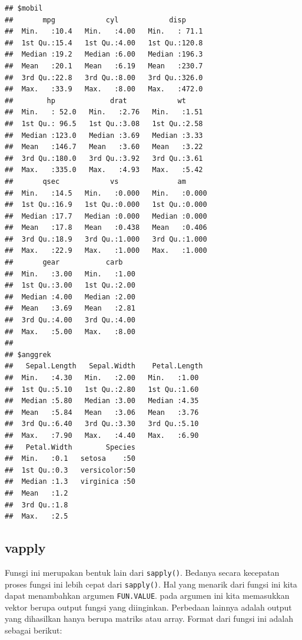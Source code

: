 \documentclass[
]{book}
\theoremstyle{definition}
\theoremstyle{definition}
\theoremstyle{definition}
\theoremstyle{definition}
\theoremstyle{remark}
\begin{document}
\begin{verbatim}
## $mobil
##       mpg            cyl            disp      
##  Min.   :10.4   Min.   :4.00   Min.   : 71.1  
##  1st Qu.:15.4   1st Qu.:4.00   1st Qu.:120.8  
##  Median :19.2   Median :6.00   Median :196.3  
##  Mean   :20.1   Mean   :6.19   Mean   :230.7  
##  3rd Qu.:22.8   3rd Qu.:8.00   3rd Qu.:326.0  
##  Max.   :33.9   Max.   :8.00   Max.   :472.0  
##        hp             drat            wt      
##  Min.   : 52.0   Min.   :2.76   Min.   :1.51  
##  1st Qu.: 96.5   1st Qu.:3.08   1st Qu.:2.58  
##  Median :123.0   Median :3.69   Median :3.33  
##  Mean   :146.7   Mean   :3.60   Mean   :3.22  
##  3rd Qu.:180.0   3rd Qu.:3.92   3rd Qu.:3.61  
##  Max.   :335.0   Max.   :4.93   Max.   :5.42  
##       qsec            vs              am       
##  Min.   :14.5   Min.   :0.000   Min.   :0.000  
##  1st Qu.:16.9   1st Qu.:0.000   1st Qu.:0.000  
##  Median :17.7   Median :0.000   Median :0.000  
##  Mean   :17.8   Mean   :0.438   Mean   :0.406  
##  3rd Qu.:18.9   3rd Qu.:1.000   3rd Qu.:1.000  
##  Max.   :22.9   Max.   :1.000   Max.   :1.000  
##       gear           carb     
##  Min.   :3.00   Min.   :1.00  
##  1st Qu.:3.00   1st Qu.:2.00  
##  Median :4.00   Median :2.00  
##  Mean   :3.69   Mean   :2.81  
##  3rd Qu.:4.00   3rd Qu.:4.00  
##  Max.   :5.00   Max.   :8.00  
## 
## $anggrek
##   Sepal.Length   Sepal.Width    Petal.Length 
##  Min.   :4.30   Min.   :2.00   Min.   :1.00  
##  1st Qu.:5.10   1st Qu.:2.80   1st Qu.:1.60  
##  Median :5.80   Median :3.00   Median :4.35  
##  Mean   :5.84   Mean   :3.06   Mean   :3.76  
##  3rd Qu.:6.40   3rd Qu.:3.30   3rd Qu.:5.10  
##  Max.   :7.90   Max.   :4.40   Max.   :6.90  
##   Petal.Width        Species  
##  Min.   :0.1   setosa    :50  
##  1st Qu.:0.3   versicolor:50  
##  Median :1.3   virginica :50  
##  Mean   :1.2                  
##  3rd Qu.:1.8                  
##  Max.   :2.5
\end{verbatim}

\hypertarget{vapply}{%
\subsection{vapply}\label{vapply}}

Funsgi ini merupakan bentuk lain dari \texttt{sapply()}. Bedanya secara kecepatan proses fungsi ini lebih cepat dari \texttt{sapply()}. Hal yang menarik dari fungsi ini kita dapat menambahkan argumen \texttt{FUN.VALUE}. pada argumen ini kita memasukkan vektor berupa output fungsi yang diinginkan. Perbedaan lainnya adalah output yang dihasilkan hanya berupa matriks atau array. Format dari fungsi ini adalah sebagai berikut:
\end{document}

